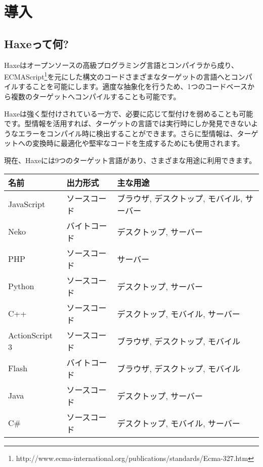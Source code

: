 \chapter{導入}
\label{introduction}

\section{Haxeって何?}
\label{introduction-what-is-haxe}


Haxeはオープンソースの高級プログラミング言語とコンパイラから成り、ECMAScript\footnote{http://www.ecma-international.org/publications/standards/Ecma-327.htm}を元にした構文のコードさまざまなターゲットの言語へとコンパイルすることを可能にします。適度な抽象化を行うため、1つのコードベースから複数のターゲットへコンパイルすることも可能です。

Haxeは強く型付けされている一方で、必要に応じて型付けを弱めることも可能です。型情報を活用すれば、ターゲットの言語では実行時にしか発見できないようなエラーをコンパイル時に検出することができます。さらに型情報は、ターゲットへの変換時に最適化や堅牢なコードを生成するためにも使用されます。

現在、Haxeには9つのターゲット言語があり、さまざまな用途に利用できます。

\begin{center}
\begin{tabular}{| l | l | l |}
	\hline
	名前 & 出力形式 & 主な用途 \\ \hline
	JavaScript & ソースコード & ブラウザ, デスクトップ, モバイル, サーバー \\
	Neko & バイトコード & デスクトップ, サーバー \\
	PHP & ソースコード & サーバー \\
	Python & ソースコード & デスクトップ, サーバー \\
	C++ & ソースコード & デスクトップ, モバイル, サーバー \\
	ActionScript 3 & ソースコード & ブラウザ, デスクトップ, モバイル \\
	Flash & バイトコード & ブラウザ, デスクトップ, モバイル \\ 
	Java & ソースコード & デスクトップ, サーバー \\
	C\# & ソースコード & デスクトップ, モバイル, サーバー \\ \hline
\end{tabular}
\end{center}


